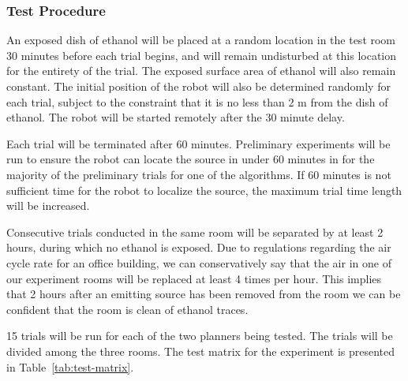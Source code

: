 \documentclass[submit]{aiaa-pretty-modified}
\begin{document}
\subsubsection{Test Procedure}

An exposed dish of ethanol will be placed at a random location in the test room
30 minutes before each trial begins, and will remain undisturbed at this
location for the entirety of the trial. The exposed surface area of ethanol will
also remain constant. The initial position of the robot will also be determined
randomly for each trial, subject to the constraint that it is no less than 2 m
from the dish of ethanol.  The robot will be started remotely after the 30
minute delay.

Each trial will be terminated after 60 minutes. Preliminary experiments will be
run to ensure the robot can locate the source in under 60 minutes in for the
majority of the preliminary trials for one of the algorithms. If 60 minutes is
not sufficient time for the robot to localize the source, the maximum trial time
length will be increased.

Consecutive trials conducted in the same room will be separated by at least 2
hours, during which no ethanol is exposed. Due to regulations regarding the air
cycle rate for an office building, we can conservatively say that the air in one
of our experiment rooms will be replaced at least 4 times per hour. This implies
that 2 hours after an emitting source has been removed from the room we can be
confident that the room is clean of ethanol traces.

15 trials will be run for each of the two planners being tested. The trials will
be divided among the three rooms. The test matrix for the experiment is
presented in Table~\ref{tab:test-matrix}. 
\end{document}
